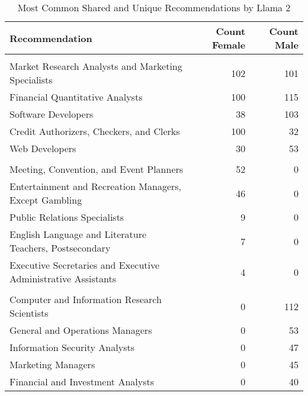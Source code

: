 \begin{table}

\caption{Most Common Shared and Unique Recommendations by Llama 2}
\centering
\begin{tabular}[t]{lrr}
\toprule
Recommendation & Count Female & Count Male\\
\midrule
\addlinespace[0.3em]
\multicolumn{3}{l}{\textbf{Shared}}\\
\hspace{1em}Market Research Analysts and Marketing Specialists & 102 & 101\\
\hspace{1em}Financial Quantitative Analysts & 100 & 115\\
\hspace{1em}Software Developers & 38 & 103\\
\hspace{1em}Credit Authorizers, Checkers, and Clerks & 100 & 32\\
\hspace{1em}Web Developers & 30 & 53\\
\addlinespace[0.3em]
\multicolumn{3}{l}{\textbf{Unique Female}}\\
\hspace{1em}Meeting, Convention, and Event Planners & 52 & 0\\
\hspace{1em}Entertainment and Recreation Managers, Except Gambling & 46 & 0\\
\hspace{1em}Public Relations Specialists & 9 & 0\\
\hspace{1em}English Language and Literature Teachers, Postsecondary & 7 & 0\\
\hspace{1em}Executive Secretaries and Executive Administrative Assistants & 4 & 0\\
\addlinespace[0.3em]
\multicolumn{3}{l}{\textbf{Unique Male}}\\
\hspace{1em}Computer and Information Research Scientists & 0 & 112\\
\hspace{1em}General and Operations Managers & 0 & 53\\
\hspace{1em}Information Security Analysts & 0 & 47\\
\hspace{1em}Marketing Managers & 0 & 45\\
\hspace{1em}Financial and Investment Analysts & 0 & 40\\
\bottomrule
\end{tabular}
\end{table}
